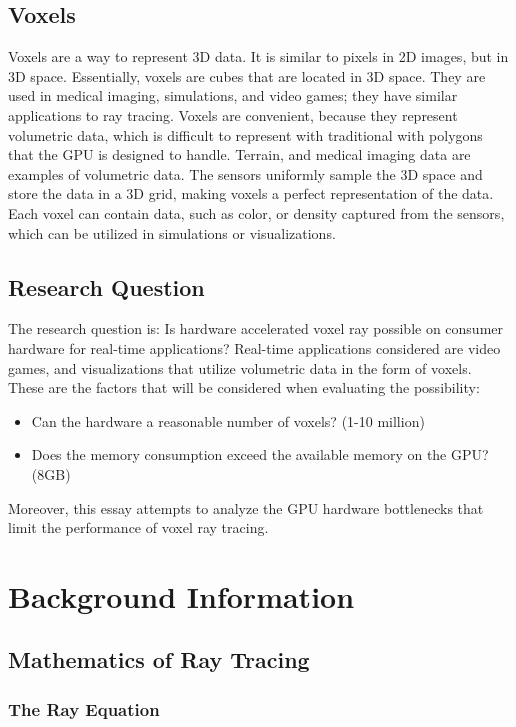 \documentclass[12pt]{article}
\begin{document}
\subsection{Voxels}

Voxels are a way to represent 3D data. It is similar to pixels in 2D images,
but in 3D space. Essentially, voxels are cubes that are located in 3D space.
They are used in medical imaging, simulations, and video games; they have
similar applications to ray tracing. Voxels are convenient, because they represent
volumetric data, which is difficult to represent with traditional with polygons that the GPU is designed to handle.
Terrain, and medical imaging data are examples of volumetric data. 
The sensors uniformly sample the 3D space and store the data in a 3D grid,
making voxels a perfect representation of the data.
Each voxel can contain data, such as color, or density captured from the sensors,
which can be utilized in simulations or visualizations.

\subsection{Research Question}

The research question is: Is hardware accelerated voxel ray possible on consumer hardware for real-time applications?
Real-time applications considered are video games, and visualizations that utilize volumetric data in the form of voxels.
These are the factors that will be considered when evaluating the possibility:
\begin{itemize}
    \itemsep0em
    \item Can the hardware a reasonable number of voxels? (1-10 million)
    \item Does the memory consumption exceed the available memory on the GPU? (8GB)
\end{itemize}

Moreover, this essay attempts to analyze the GPU hardware bottlenecks that limit the performance of voxel ray tracing.

\section{Background Information}

\subsection{Mathematics of Ray Tracing}
\subsubsection{The Ray Equation}
\end{document}

